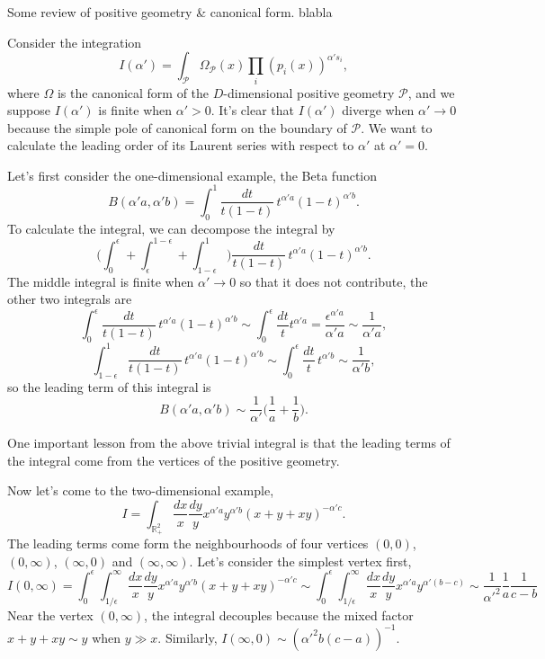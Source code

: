 \documentclass[12pt]{article}
\theoremstyle{definition}
\theoremstyle{plain}
\begin{document}
Some review of positive geometry \& canonical form. blabla

Consider the integration
\begin{equation}\label{int}
	I(\alpha')=\int_{\mathcal P} \Omega_{\mathcal P}(x)\prod_i(p_i(x))^{\alpha' s_i},
\end{equation}
where $\Omega$ is the canonical form of the $D$-dimensional positive geometry $\mathcal P$, and we suppose $I(\alpha')$ is finite when $\alpha'>0$.
It's clear that $I(\alpha')$ diverge when $\alpha'\to 0$ because the simple pole of canonical form on the boundary of $\mathcal P$. We want to calculate the leading order of its Laurent series with respect to $\alpha'$ at $\alpha'=0$. %


Let's first consider the one-dimensional example, the Beta function 
\[
	B(\alpha' a,\alpha' b)=\int_0^1 \frac{dt}{t(1-t)}\, t^{\alpha' a}(1-t)^{\alpha' b}.
\]
To calculate the integral, we can decompose the integral by 
\[
	\biggl(\int_{0}^\epsilon +\int_\epsilon^{1-\epsilon}+\int_{1-\epsilon}^1\biggr) \frac{dt}{t(1-t)}\, t^{\alpha' a}(1-t)^{\alpha' b}.
\]
The middle integral is finite when $\alpha'\to 0$ so that it does not contribute, the other two integrals are
\[
	\int_0^\epsilon  \frac{dt}{t(1-t)}\, t^{\alpha' a}(1-t)^{\alpha' b}
	\sim \int_0^\epsilon \frac{dt}t t^{\alpha' a} 
	= \frac{\epsilon^{\alpha' a}}{\alpha'a} \sim \frac{1}{\alpha'a},
	\]
\[
	\int_{1-\epsilon}^1  \frac{dt}{t(1-t)}\, t^{\alpha' a}(1-t)^{\alpha' b}
	\sim \int_0^\epsilon \frac{dt}{t}\, t^{\alpha' b} \sim \frac{1}{\alpha' b},
\]
so the leading term of this integral is 
\[
	B(\alpha' a,\alpha' b)\sim\frac 1{\alpha'}\biggl(\frac 1a+\frac 1b\biggr).
\]

One important lesson from the above trivial integral is that the leading terms of the integral come from the vertices of the positive geometry. 

Now let's come to the two-dimensional example,
\[
	I=\int_{\mathbb R_+^2} \frac{dx}{x}\frac{dy}{y}x^{\alpha' a}y^{\alpha' b}(x+y+x y)^{-\alpha' c}.
\]
The leading terms come form the neighbourhoods of four vertices $(0,0)$, $(0,\infty)$, $(\infty,0)$ and $(\infty,\infty)$. Let's consider the simplest vertex first, 
\[
	I(0,\infty)=\int_{0}^\epsilon\int_{1/\epsilon}^\infty \frac{dx}{x}\frac{dy}{y}x^{\alpha' a}y^{\alpha' b}(x+y+xy)^{-\alpha' c}\sim \int_{0}^\epsilon\int_{1/\epsilon}^\infty \frac{dx}{x}\frac{dy}{y}x^{\alpha' a}y^{\alpha' (b-c)}\sim 
	\frac{1}{{\alpha'}^2}\frac{1}{a} \frac{1}{c-b}
\]
Near the vertex $(0,\infty)$, the integral decouples because the mixed factor $x+y+xy \sim y$ when $y \gg x$.  Similarly, $I(\infty,0)\sim ({\alpha'}^2 b (c-a))^{-1}$. 
\end{document}
